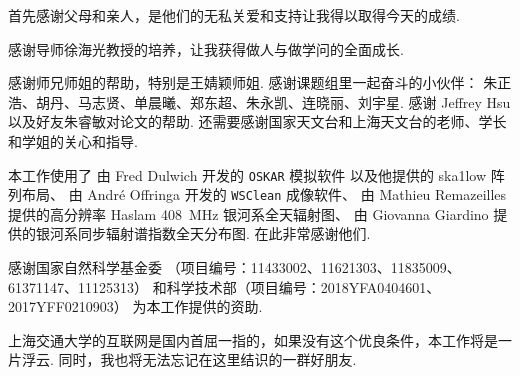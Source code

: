 
\begin{thanks}

首先感谢父母和亲人，是他们的无私关爱和支持让我得以取得今天的成绩.

感谢导师徐海光教授的培养，让我获得做人与做学问的全面成长.

感谢师兄师姐的帮助，特别是王婧颖师姐.
感谢课题组里一起奋斗的小伙伴：
朱正浩、胡丹、马志贤、单晨曦、郑东超、朱永凯、连晓丽、刘宇星.
感谢 Jeffrey Hsu 以及好友朱睿敏对论文的帮助.
还需要感谢国家天文台和上海天文台的老师、学长和学姐的关心和指导.

本工作使用了
由 Fred Dulwich 开发的 \texttt{OSKAR} 模拟软件
以及他提供的 \acs{ska1low} 阵列布局、
由 André Offringa 开发的 \texttt{WSClean} 成像软件、
由 Mathieu Remazeilles 提供的高分辨率 Haslam \SI{408}{\MHz}
银河系全天辐射图、
由 Giovanna Giardino 提供的银河系同步辐射谱指数全天分布图.
在此非常感谢他们.

感谢国家自然科学基金委
（项目编号：11433002、11621303、11835009、61371147、11125313）
和科学技术部（项目编号：2018YFA0404601、2017YFF0210903）
为本工作提供的资助.

上海交通大学的互联网是国内首屈一指的，如果没有这个优良条件，本工作将是一片浮云.
同时，我也将无法忘记在这里结识的一群好朋友.


\end{thanks}
